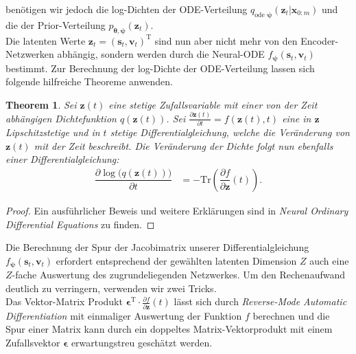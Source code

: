 \documentclass[12pt]{article}
\newtheorem{theorem}{Theorem}
\begin{document}
	benötigen wir jedoch die log-Dichten der ODE-Verteilung $q_{\text{ode }\boldsymbol\psi}(\mathbf{z}_{t}|\mathbf{x}_{0:m})$ und die der Prior-Verteilung $p_{\boldsymbol\theta,\boldsymbol\psi}(\mathbf{z}_{t})$.\\
	Die latenten Werte $\mathbf{z}_{t} = (\mathbf{s}_{t},\mathbf{v}_{t})^{\mathrm{T}}$ sind nun aber nicht mehr von den Encoder-Netzwerken abhängig, sondern werden durch die Neural-ODE $f_{\boldsymbol\psi}(\mathbf{s}_{t},\mathbf{v}_{t})$ bestimmt.
	Zur Berechnung der log-Dichte der ODE-Verteilung lassen sich folgende hilfreiche Theoreme anwenden.
	\begin{theorem}
		Sei $\mathbf{z}(t)$ eine stetige Zufallsvariable mit einer von der Zeit abhängigen Dichtefunktion $q(\mathbf{z}(t))$. Sei $\tfrac{\partial \mathbf{z}(t)}{\partial t}=f(\mathbf{z}(t),t)$ eine in $\mathbf{z}$ Lipschitzstetige und in $t$ stetige Differentialgleichung, welche die Veränderung von $\mathbf{z}(t)$ mit der Zeit beschreibt.
		Die Veränderung der Dichte folgt nun ebenfalls einer Differentialgleichung:
		\begin{align*}
		\dfrac{\partial \log\big(q(\mathbf{z}(t))\big)}{\partial t}&= - \mathrm{Tr}\left(\dfrac{\partial f}{\partial\mathbf{z}}(t)\right).
		\end{align*}
	\end{theorem}
	\begin{proof}
		Ein ausführlicher Beweis und weitere Erklärungen sind  in \emph{Neural Ordinary Differential Equations} \cite{neuralode} zu finden.
	\end{proof}
	Die Berechnung der Spur der Jacobimatrix unserer Differentialgleichung $f_{\boldsymbol\psi}(\mathbf{s}_{t},\mathbf{v}_{t})$ erfordert entsprechend der gewählten latenten Dimension $Z$ auch eine $Z$-fache Auswertung des zugrundeliegenden Netzwerkes. Um den Rechenaufwand deutlich zu verringern, verwenden wir zwei Tricks.\cite{ffjord}\\
	Das Vektor-Matrix Produkt $\boldsymbol\epsilon^\mathrm{T} \cdot \tfrac{\partial f}{\partial\mathbf{z}}(t)$ lässt sich durch \emph{Reverse-Mode Automatic Differentiation} mit einmaliger Auswertung der Funktion $f$ berechnen und die Spur einer Matrix kann durch ein doppeltes Matrix-Vektorprodukt mit einem Zufallsvektor $\boldsymbol\epsilon$ erwartungstreu geschätzt werden.
	
\end{document}
